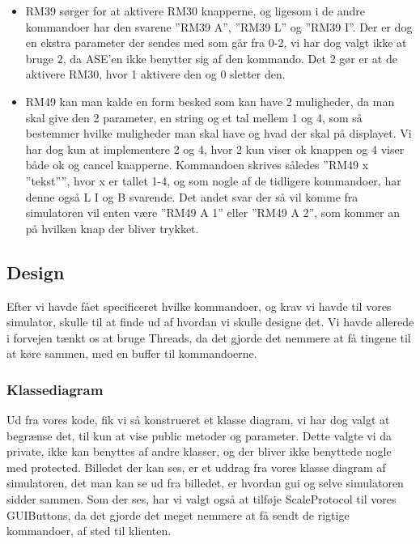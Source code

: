 \documentclass[a4paper]{article}
\begin{document}
\begin{itemize}
  \item RM39 sørger for at aktivere RM30 knapperne, og ligesom i de andre kommandoer har den svarene ”RM39 A”, ”RM39 L” og ”RM39 I”. Der er dog en ekstra parameter der sendes med som går fra 0-2, vi har dog valgt ikke at bruge 2, da ASE’en ikke benytter sig af den kommando. Det 2 gør er at de aktivere RM30, hvor 1 aktivere den og 0 sletter den.

  \item RM49 kan man kalde en form besked som kan have 2 muligheder, da man skal give den 2 parameter, en string og et tal mellem 1 og 4, som så bestemmer hvilke muligheder man skal have og hvad der skal på displayet. Vi har dog kun at implementere 2 og 4, hvor 2 kun viser ok knappen og 4 viser både ok og cancel knapperne. Kommandoen skrives således ”RM49 x ”tekst””, hvor x er tallet 1-4, og som nogle af de tidligere kommandoer, har denne også L I og B svarende. Det andet svar der så vil komme fra simulatoren vil enten være ”RM49 A 1” eller ”RM49 A 2”, som kommer an på hvilken knap der bliver trykket.
\end{itemize}



\subsection{Design} %

Efter vi havde fået specificeret hvilke kommandoer, og krav vi havde til vores simulator, skulle til at finde ud af hvordan vi skulle designe det. Vi havde allerede i forvejen tænkt os at bruge Threads, da det gjorde det nemmere at få tingene til at køre sammen, med en buffer til kommandoerne.

\subsubsection*{Klassediagram} %

Ud fra vores kode, fik vi så konstrueret et klasse diagram, vi har dog valgt at begrænse det, til kun at vise public metoder og parameter. Dette valgte vi da private, ikke kan benyttes af andre klasser, og der bliver ikke benyttede nogle med protected. Billedet der kan ses, er et uddrag fra vores klasse diagram af simulatoren, det man kan se ud fra billedet, er hvordan gui og selve simulatoren sidder sammen. Som der ses, har vi valgt også at tilføje ScaleProtocol til vores GUIButtons, da det gjorde det meget nemmere at få sendt de rigtige kommandoer, af sted til klienten.
\end{document}
